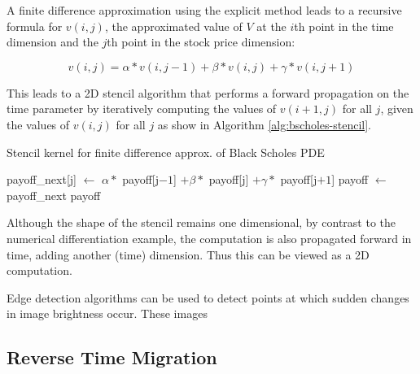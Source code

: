 A finite difference approximation using the explicit method leads to a
recursive formula \cite{blackscholes} for $v(i, j)$, the approximated
value of $V$ at the $i$th point in the time dimension and the $j$th
point in the stock price dimension:

\begin{equation}
  v(i, j) =
  \alpha * v(i, j - 1) +
  \beta  * v(i, j) +
  \gamma * v(i, j + 1)
\end{equation}

This leads to a 2D stencil algorithm that performs a forward
propagation on the time parameter by iteratively computing the values
of $v(i + 1, j)$ for all $j$, given the values of $v(i, j)$ for all
$j$ as show in Algorithm \ref{alg:bscholes-stencil}.

\begin{algorithm}
  \caption{Stencil kernel for finite difference approx. of Black Scholes PDE}
  \label{alg:bscholes-stencil}
  \begin{algorithmic}
    \State payoff\_next[j] $\gets$ $\alpha *$ payoff[j$ -1$] $+ \beta *$ payoff[j] $ + \gamma * $ payoff[j$ + 1$]
    \EndFor
    \State payoff $\gets$ payoff\_next
    \EndFor
    \State \Return payoff
    \EndFunction
  \end{algorithmic}
\end{algorithm}

Although the shape of the stencil remains one dimensional, by contrast to
the numerical differentiation example, the computation is also
propagated forward in time, adding another (time) dimension. Thus this
can be viewed as a 2D computation.


Edge detection algorithms can be used to detect points at which sudden
changes in image brightness occur. These images

\subsection{Reverse Time Migration}

